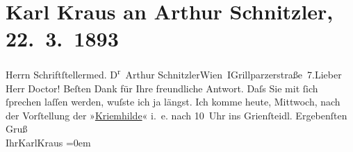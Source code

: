 

         
         \renewcommand{\erwaehntePersonen}{Personen: Karl Kraus}
         \renewcommand{\erwaehnteOrte}{Orte: Café Griensteidl, Grillparzerstraße, I., Innere Stadt, Wien}
         \renewcommand{\erwaehnteWerke}{Werke: Kriemhilde}
               \section[Karl Kraus an Arthur Schnitzler, 22. 3. 1893]{ Karl Kraus an Arthur Schnitzler, 22. 3. 1893}\nopagebreak{}\rehead{ }\begin{ledgroupsized}[t]{13cm}\normalsize\beginnumbering{} \toendnotes[C]{\smallbreak\pagebreak[2]} 
\pstart{}{\pb}Herrn Schriftſteller\pend{}\pstart{}med. D\textsuperscript{r} Arthur Schnitzler\pend{}\pstart{}Wien I\pend{}\pstart{}Grillparzerstraße 7.\pend{}{\bigskip}\pstart{}{\pb}Lieber Herr Doctor!\pend\pstart
           Beſten Dank für Ihre freundliche Antwort. Daſs Sie mit ſich ſprechen laſſen werden,
               wuſste ich ja längst. Ich komme heute, Mittwoch, nach der Vorſtellung
               der »\uline{Kriemhilde}« i. e. nach 10 Uhr ins Grienſteidl.\pend
           \pstart
           Ergebenſten Gruß{\\[\baselineskip]}Ihr\hspace*{3.5em}\spacefill\mbox{KarlKraus}\pend
           \leftskip=0em{}
         
         \endnumbering{}\end{ledgroupsized}  \newcommand{\dateiname}{L00192}\newcommand{\titel}{Karl Kraus an Arthur Schnitzler, 22. 3. 1893}\newcommand{\editorInnen}{Martin Anton Müller und Gerd-Hermann Susen}
      